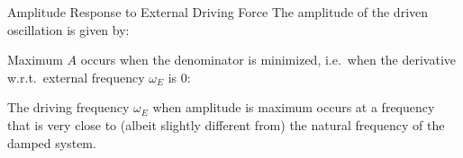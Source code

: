\documentclass[12pt,compress,aspectratio=169]{beamer}
\begin{document}
\begin{frame}{Amplitude Response to External Driving Force}
  The amplitude of the driven oscillation is given by:
  
  
  Maximum $A$ occurs when the denominator is minimized, i.e.\ when the
  derivative w.r.t.\ external frequency $\omega_E$ is 0:


  The driving frequency $\omega_E$ when amplitude is maximum occurs at a
  frequency that is very close to (albeit slightly different from) the natural
  frequency of the damped system.
%  
\end{frame}
\end{document}
